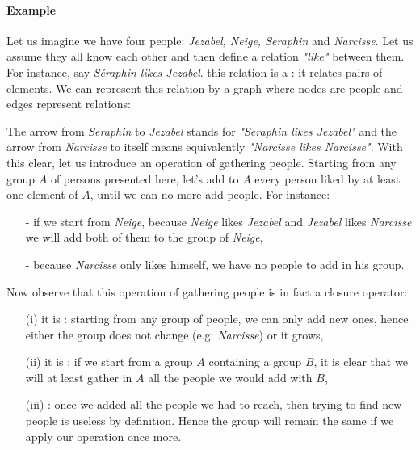 \vspace{1.2em}

\paragraph{Example} Let us imagine we have four people: \textit{Jezabel, Neige, 
Seraphin} and \textit{Narcisse}. Let us assume they all know each other and then
define a relation \textit{"like"} between them. For instance, say 
\textit{Séraphin likes Jezabel}. this relation is a : 
it relates pairs of elements. We can represent this relation by a graph where 
nodes are people and edges represent relations:

\begin{figure}[ht]
	
\end{figure}

The arrow from \textit{Seraphin} to \textit{Jezabel} stands for 
\textit{"Seraphin likes Jezabel"} and the arrow from \textit{Narcisse} to itself
means equivalently \textit{"Narcisse likes Narcisse"}. With this clear, let 
us introduce an operation of gathering people. Starting from any group $A$ of 
persons presented here, let's add to $A$ every person liked by at least one 
element of $A$, until we can no more add people. For instance:
\begin{itemize}
	\item[-] if we start from \textit{Neige}, because \textit{Neige} likes
	\textit{Jezabel} and \textit{Jezabel} likes \textit{Narcisse} we will add
	both of them to the group of \textit{Neige},
	\item[-] because \textit{Narcisse} only likes himself, we have no people
	to add in his group.
\end{itemize}
\noindent Now observe that this operation of gathering people is in fact a
closure operator:
\begin{itemize}
	\item[(i)] it is : starting from any group of people,
	we can only add new ones, hence either the group does not change (e.g: 
	\textit{Narcisse}) or it grows,
	\item[(ii)] it is : if we start from a group $A$ containing
	a group $B$, it is clear that we will at least gather in $A$ all the people
	we would add with $B$,
	\item[(iii)] : once we added all the people we had to
	reach, then trying to find new people is useless by definition. Hence the
	group will remain the same if we apply our operation once more.
\end{itemize}

